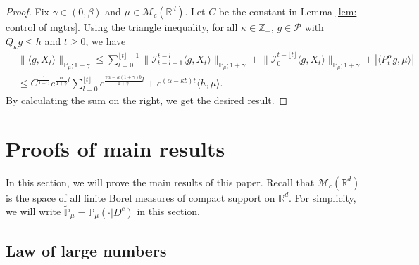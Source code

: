 \documentclass[12pt,a4paper]{amsart}
\theoremstyle{plain}
\theoremstyle{definition}
\numberwithin{equation}{section}
\begin{document}
\begin{proof}
  Fix $\gamma \in (0,\beta)$ and $\mu \in \mathcal M_c(\mathbb R^d)$.
  Let $C$ be the constant in Lemma \ref{lem: control of mgtrs}.
  Using the triangle inequality, for all $\kappa\in \mathbb Z_+$, $g \in \mathcal P$ with $Q_\kappa g \leq h$ and $t\geq 0$, we have
\begin{align}
  & \|\langle g,X_t\rangle\|_{\mathbb P_\mu;1+\gamma}
    \leq \sum_{l=0}^{\lfloor t\rfloor - 1}\big\| \mathcal{I}_{t-l-1}^{t-l}\langle g,X_t\rangle \big\|_{\mathbb P_\mu;1+\gamma}+\big\| \mathcal{I}_{0}^{t-\lfloor t \rfloor}\langle g,X_t\rangle  \big\|_{\mathbb P_\mu;1+\gamma} + |\langle P^\alpha_t g,\mu\rangle| \\ 
  & \leq C^{\frac{1}{1+\gamma}} e^{\frac{\alpha}{1+\gamma}t} \sum_{l=0}^{\lfloor t\rfloor} e^{\frac{\gamma\alpha-\kappa (1+\gamma)b}{1+\gamma} l} + e^{(\alpha - \kappa b)t} \langle h,\mu\rangle.
\end{align}
By calculating the sum on the right, we get the desired result.
\end{proof}

\section{Proofs of main results}
\label{proofs of main results}
In this section, we will prove the main results of this paper. Recall that $\mathcal{M}_c(\mathbb{R}^d)$ is the space of all finite Borel measures of compact support on $\mathbb{R}^d$.
For simplicity, we will write $\mathbb{\widetilde{P}}_{\mu}=\mathbb{P}_{\mu}(\cdot|D^c)$ in this section.

\subsection{Law of large numbers}
\label{sec: large rate lln}
\end{document}

